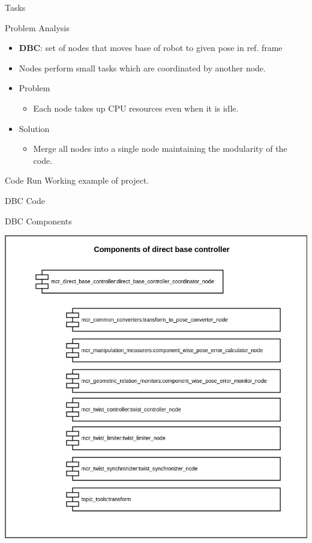 \documentclass[9pt,usenames,dvipsnames]{beamer}
\title{\topicClass}
\subtitle{\topicTitle}
\date{Presentation date: \topicDueDate}
\author[\authorLastName]{\authorFullName}
\begin{document}
\maketitle

\begin{frame}{Tasks}
	\begin{alertblock}{Problem Analysis}
	\begin{itemize}
	\item \textbf{DBC}: set of nodes that moves base of robot to given pose in ref. frame
	\item Nodes perform small tasks which are coordinated by another node.
	\item Problem
	\begin{itemize}
	\item Each node takes up CPU resources even when it is idle.
	\end{itemize}
	\item Solution
	\begin{itemize}
	\item Merge all nodes into a single node maintaining the modularity of the code.
	\end{itemize}
	\end{itemize}
    \end{alertblock}
    
    \begin{alertblock}{Code Run}
    Working example of project.
    \end{alertblock}
\end{frame}

\begin{frame}{DBC Code}
	\begin{alertblock}{DBC Components}
	\begin{center}
		\includegraphics[width=.7\textwidth]{dbc_components.jpeg}
	\end{center}
    \end{alertblock}
\end{frame}
\end{document}
